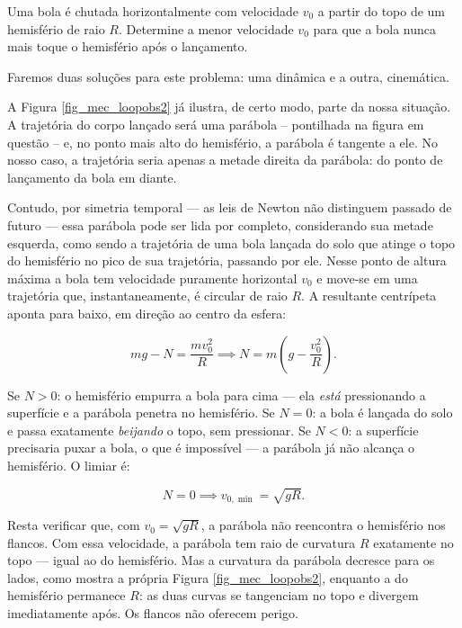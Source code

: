\begin{exemplo}\label{exemplo_newton_vloopex02b}

Uma bola é chutada horizontalmente com velocidade $v_0$ a partir do topo de um hemisfério de raio $R$. Determine a menor velocidade $v_0$ para que a bola nunca mais toque o hemisfério após o lançamento.


\resolucao

Faremos duas soluções para este problema: uma dinâmica e a outra, cinemática.



A Figura \ref{fig_mec_loopobs2} já ilustra, de certo modo, parte da nossa situação. A trajetória do corpo lançado será uma parábola -- pontilhada na figura em questão -- e, no ponto mais alto do hemisfério, a parábola é tangente a ele. No nosso caso, a trajetória seria apenas a metade direita da parábola: do ponto de lançamento da bola em diante.

\medskip

Contudo, por simetria temporal --- as leis de Newton
não distinguem passado de futuro --- essa parábola pode ser lida por completo, considerando sua metade esquerda, como sendo a trajetória de uma bola lançada do solo que atinge o topo do hemisfério no pico
de sua trajetória, passando por ele. Nesse ponto de altura máxima a bola tem velocidade puramente horizontal $v_0$
e move-se em uma trajetória que, instantaneamente, é circular de raio $R$. A resultante centrípeta aponta para baixo, em direção ao centro da esfera:

$$ mg - N = \frac{mv_0^2}{R} \implies N = m\!\left(g - \frac{v_0^2}{R}\right). $$

Se $N > 0$: o hemisfério empurra a bola para cima --- ela \textit{está} pressionando
a superfície e a parábola penetra no hemisfério. Se $N = 0$: a bola é lançada do solo e passa exatamente
\textit{beijando} o topo, sem pressionar. Se $N < 0$: a superfície precisaria puxar
a bola, o que é impossível --- a parábola já não alcança o hemisfério. O limiar é:

$$ N = 0 \implies \boxed{v_{0,\min} = \sqrt{gR}.} $$

Resta verificar que, com $v_0 = \sqrt{gR}$, a parábola não reencontra o hemisfério
nos flancos. Com essa velocidade, a parábola tem raio de curvatura $R$ exatamente
no topo --- igual ao do hemisfério. Mas a curvatura da parábola decresce para os
lados, como mostra a própria Figura \ref{fig_mec_loopobs2}, enquanto a do hemisfério permanece $R$: as duas curvas se tangenciam no topo
e divergem imediatamente após. Os flancos não oferecem perigo.


\end{exemplo}
